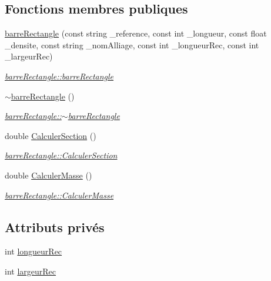 \subsection*{Fonctions membres publiques}
\begin{DoxyCompactItemize}
\item 
\hyperlink{classbarre_rectangle_a3d5270d95f3ee2c6d4074495f7fd9859}{barre\+Rectangle} (const string \+\_\+reference, const int \+\_\+longueur, const float \+\_\+densite, const string \+\_\+nom\+Alliage, const int \+\_\+longueur\+Rec, const int \+\_\+largeur\+Rec)
\begin{DoxyCompactList}\small\item\em \hyperlink{classbarre_rectangle_a3d5270d95f3ee2c6d4074495f7fd9859}{barre\+Rectangle\+::barre\+Rectangle} \end{DoxyCompactList}\item 
\hyperlink{classbarre_rectangle_a27c21df460fbde7f24ac2a7540558091}{$\sim$barre\+Rectangle} ()
\begin{DoxyCompactList}\small\item\em \hyperlink{classbarre_rectangle_a27c21df460fbde7f24ac2a7540558091}{barre\+Rectangle\+::$\sim$barre\+Rectangle} \end{DoxyCompactList}\item 
double \hyperlink{classbarre_rectangle_a321e3526a980b5d48a5cf9a05ee2b63a}{Calculer\+Section} ()
\begin{DoxyCompactList}\small\item\em \hyperlink{classbarre_rectangle_a321e3526a980b5d48a5cf9a05ee2b63a}{barre\+Rectangle\+::\+Calculer\+Section} \end{DoxyCompactList}\item 
double \hyperlink{classbarre_rectangle_ac558660f43d5e18472aaa57ee98d5fd0}{Calculer\+Masse} ()
\begin{DoxyCompactList}\small\item\em \hyperlink{classbarre_rectangle_ac558660f43d5e18472aaa57ee98d5fd0}{barre\+Rectangle\+::\+Calculer\+Masse} \end{DoxyCompactList}\end{DoxyCompactItemize}
\subsection*{Attributs privés}
\begin{DoxyCompactItemize}
\item 
int \hyperlink{classbarre_rectangle_a5df869c01c9a2e2dad98fa392fa59c85}{longueur\+Rec}
\item 
int \hyperlink{classbarre_rectangle_a9420b90a6b3d44b807ca716abae6039e}{largeur\+Rec}
\end{DoxyCompactItemize}
